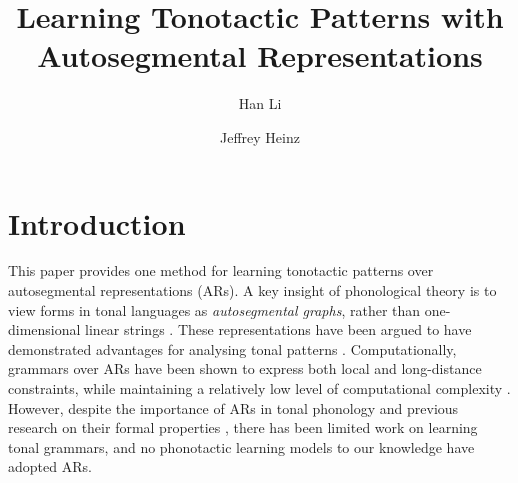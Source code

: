 \documentclass{CUP-JNL-PHO}%
\theoremstyle{definition}
\numberwithin{equation}{section}
\theoremstyle{definition}
\begin{document}
\begin{Frontmatter}

\title{Learning Tonotactic Patterns with Autosegmental Representations}

\author[]{Han Li}
\author[]{Jeffrey Heinz}


\address[]{,
	,
	,
	,
	}


	




\end{Frontmatter}



\tableofcontents

\section{Introduction}\label{sec:intro} 
This paper provides one
method for learning tonotactic patterns over autosegmental
representations (ARs). A key insight of phonological theory is to view
forms in tonal languages as \textit{autosegmental graphs}, rather than
one-dimensional linear strings \citep{goldsmith1976autosegmental,
	coleman1991no, jardine2017LocalNature,
	oakdenNotationalEquivalenceTonal2020}. These representations have
been argued to have demonstrated advantages for analysing tonal
patterns \citep{hyman2009representation, clements2010autosegmental,
	oddenintroducing2013}.  Computationally, grammars over ARs have been
shown to express both local and long-distance constraints, while
maintaining a relatively low level of computational complexity
\citep{jardine2017LocalNature, chandleejardine19aisl}.  However,
despite the importance of ARs in tonal phonology and previous research
on their formal properties \citep{kornai2007mathematical}, there has
been limited work on learning tonal grammars, and no phonotactic
learning models to our knowledge have adopted ARs.
\end{document}
